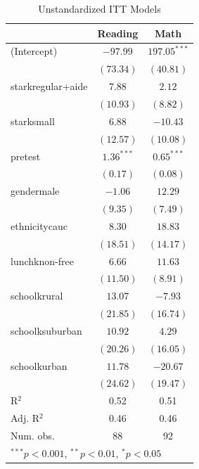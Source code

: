 \documentclass[doc]{apa6}\usepackage[]{graphicx}\usepackage[]{color}
\begin{document}
\begin{table}[h]
\begin{center}
\begin{tabular}{l c c }
\hline
                  & Reading & Math \\
\hline
(Intercept)       & $-97.99$     & $197.05^{***}$ \\
                  & $(73.34)$    & $(40.81)$      \\
starkregular+aide & $7.88$       & $2.12$         \\
                  & $(10.93)$    & $(8.82)$       \\
starksmall        & $6.88$       & $-10.43$       \\
                  & $(12.57)$    & $(10.08)$      \\
pretest           & $1.36^{***}$ & $0.65^{***}$   \\
                  & $(0.17)$     & $(0.08)$       \\
gendermale        & $-1.06$      & $12.29$        \\
                  & $(9.35)$     & $(7.49)$       \\
ethnicitycauc     & $8.30$       & $18.83$        \\
                  & $(18.51)$    & $(14.17)$      \\
lunchknon-free    & $6.66$       & $11.63$        \\
                  & $(11.50)$    & $(8.91)$       \\
schoolkrural      & $13.07$      & $-7.93$        \\
                  & $(21.85)$    & $(16.74)$      \\
schoolksuburban   & $10.92$      & $4.29$         \\
                  & $(20.26)$    & $(16.05)$      \\
schoolkurban      & $11.78$      & $-20.67$       \\
                  & $(24.62)$    & $(19.47)$      \\
\hline
R$^2$             & 0.52         & 0.51           \\
Adj. R$^2$        & 0.46         & 0.46           \\
Num. obs.         & 88           & 92             \\
\hline
\multicolumn{3}{l}{\scriptsize{$^{***}p<0.001$, $^{**}p<0.01$, $^*p<0.05$}}
\end{tabular}
\caption{Unstandardized ITT Models}
\label{table:coefficients}
\end{center}
\end{table}
\end{document}
